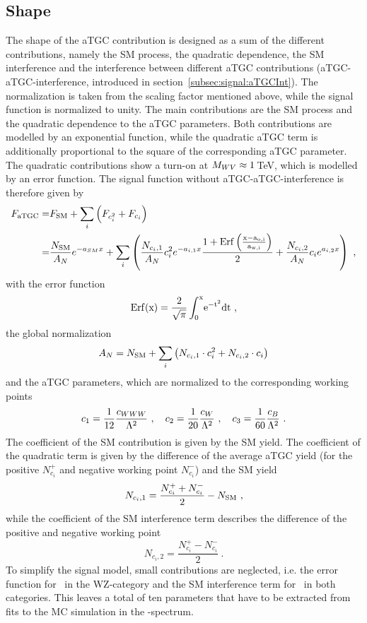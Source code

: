 \subsection*{Shape}
The shape of the aTGC contribution is designed as a sum of the different contributions, namely the SM process, the quadratic dependence, the SM interference and the interference between different aTGC contributions (aTGC-aTGC-interference, introduced in section~\ref{subsec:signal:aTGCInt}). The normalization is taken from the scaling factor mentioned above, while the signal function is normalized to unity. The main contributions are the SM process and the quadratic dependence to the aTGC parameters. Both contributions are modelled by an exponential function, while the quadratic aTGC term is additionally proportional to the square of the corresponding aTGC parameter. The quadratic contributions show a turn-on at $M_{WV} \approx 1$\,TeV, which is modelled by an error function. The signal function without aTGC-aTGC-interference is therefore given by
\begin{align}
F_{\rm aTGC} =& F_{\rm SM} + \sum_i \left( F_{c_i^2} + F_{c_i} \right) \\
=& \frac{N_{\rm SM}}{A_N} e^{-a_{SM}x} + \sum_i \left( \frac{N_{c_i,1}}{A_N} c_i^2 e^{-a_{i,1} x} \frac{1+\rm{Erf}\left(\frac{x-a_{o,i}}{a_{w,i}}\right)}{2} + \frac{N_{c_i,2}}{A_N} c_i e^{a_{i,2}x} \right)  ~,
\label{eq:signal:sigfunc}
\end{align}
with the error function
\begin{equation}
\rm{Erf}(x) = \frac{2}{\sqrt{\pi}}\int_0^x \! e^{-t^2}{\rm dt} ~,
\end{equation}
the global normalization
\begin{equation}
A_N = N_{\rm SM} + \sum_i \left( N_{c_i,1}\cdot c_i^2 + N_{c_i,2}\cdot c_i \right) 
\label{eq:signal:globnorm}
\end{equation} 
and the aTGC parameters, which are normalized to the corresponding working points
\begin{equation}
c_1 = \frac{1}{12}\frac{c_{WWW}}{\Lambda^2} ~ , \quad c_2 = \frac{1}{20}\frac{c_{W}}{\Lambda^2} ~ , \quad c_3 = \frac{1}{60}\frac{c_{B}}{\Lambda^2} ~.
\end{equation}
The coefficient of the SM contribution is given by the SM yield. The coefficient of the quadratic term is given by the difference of the average aTGC yield (for the positive $N_{c_i}^{+}$ and negative working point $N_{c_i}^{-}$) and the SM yield
\begin{equation}
N_{c_i,1} = \frac{N_{c_i}^{+}+N_{c_i}^{-}}{2}-N_{\rm SM} ~,
\label{eq:signal:n1}
\end{equation}
while the coefficient of the SM interference term describes the difference of the positive and negative working point
\begin{equation}
N_{c_i,2} = \frac{N_{c_i}^{+}-N_{c_i}^{-}}{2} ~.
\label{eq:signal:n2}
\end{equation}
To simplify the signal model, small contributions are neglected, i.e. the error function for \Tcb \ in the WZ-category and the SM interference term for \Tcwww \ in both categories. This leaves a total of ten parameters that have to be extracted from fits to the MC simulation in the \MWV -spectrum.\\

